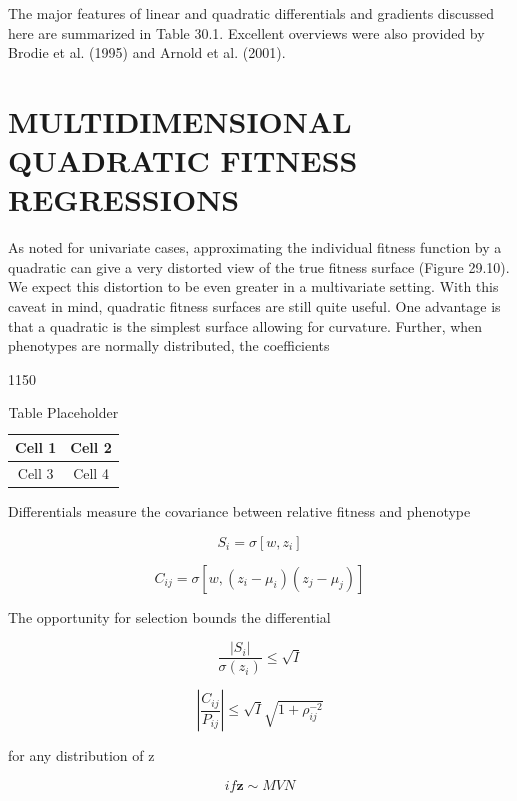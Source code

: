\documentclass{article}
\begin{document}
The major features of linear and quadratic differentials and gradients discussed here are summarized in Table 30.1. Excellent overviews were also provided by Brodie et al. (1995) and Arnold et al. (2001).

\section{MULTIDIMENSIONAL QUADRATIC FITNESS REGRESSIONS}
As noted for univariate cases, approximating the individual fitness function by a quadratic can give a very distorted view of the true fitness surface (Figure 29.10). We expect this distortion to be even greater in a multivariate setting. With this caveat in mind, quadratic fitness surfaces are still quite useful. One advantage is that a quadratic is the simplest surface allowing for curvature. Further, when phenotypes are normally distributed, the coefficients

1150

\begin{table}[h]
\centering
\begin{tabular}{|c|c|}
\hline
Cell 1 & Cell 2 \\
\hline
Cell 3 & Cell 4 \\
\hline
\end{tabular}
\caption{Table Placeholder}
\end{table}

Differentials measure the covariance between relative fitness and phenotype

\begin{equation}
S_{i}=\sigma\left[w,z_{i}\right]
\end{equation}

\begin{equation}
C_{i j}=\sigma\left[w,(z_{i}-\mu_{i})(z_{j}-\mu_{j})\right]
\end{equation}

The opportunity for selection bounds the differential

\begin{equation}
\frac{\left|S_{i}\right|}{\sigma(z_{i})}\leq\sqrt{I}
\end{equation}

\begin{equation}
\left|\frac{C_{ij}}{P_{ij}}\right|\leq\sqrt{I}\sqrt{1+\rho_{ij}^{-2}}
\end{equation}

for any distribution of z

\begin{equation}
if\mathbf{z}\sim MVN
\end{equation}
\end{document}
